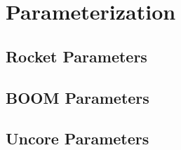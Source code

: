 \chapter{Parameterization}\label{chapter:parameterization}

\section{Rocket Parameters}
\section{BOOM Parameters}
\section{Uncore Parameters}